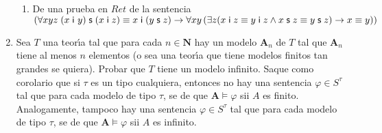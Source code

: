 \documentclass{article}
\begin{document}
\begin{enumerate}
\begin{enumerate}
\item De una prueba en $Ret$ de la sentencia $(\forall xyz\;(x\;\mathsf{i}\
y)\;\mathsf{s}\;(x\;\mathsf{i}\;z)\equiv x\;\mathsf{i}\;(y\;\mathsf{s}%
\;z)\rightarrow \forall xy\left( \exists z(x\;\mathsf{i}\;z\equiv y\;\mathsf{%
i}\;z\wedge x\;\mathsf{s}\;z\equiv y\;\mathsf{s}\;z)\rightarrow x\equiv
y\right) )$
\end{enumerate}

\item Sea $T$ una teor\'{\i}a tal que para cada $n\in \mathbf{N}$ hay un
modelo $\mathbf{A}_{n}$ de $T$ tal que $\mathbf{A}_{n}$ tiene al menos $n$
elementos (o sea una teor\'{\i}a que tiene modelos finitos tan grandes se
quiera). Probar que $T$ tiene un modelo infinito. Saque como corolario que
si $\tau $ es un tipo cualquiera, entonces no hay una sentencia $\varphi \in
S^{\tau }$ tal que para cada modelo de tipo $\tau $, se de que $\mathbf{A}%
\vDash \varphi $ sii $A$ es finito. Analogamente, tampoco hay una sentencia $%
\varphi \in S^{\tau }$ tal que para cada modelo de tipo $\tau $, se de que $%
\mathbf{A}\vDash \varphi $ sii $A$ es infinito.
\end{enumerate}
\end{document}

